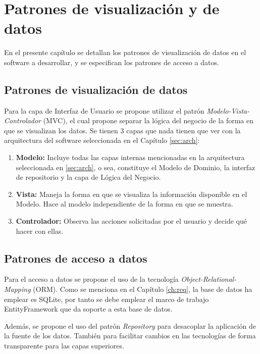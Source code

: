 \chapter{Patrones de visualización y de datos}

En el presente capítulo se detallan los patrones de visualización de datos en el software a desarrollar, y se especifican los patrones de acceso a datos.

\section{Patrones de visualización de datos}\label{sec:vis}

Para la capa de Interfaz de Usuario se propone utilizar el patrón \textit{Modelo-Vista-Controlador} (MVC), el cual propone separar la lógica del negocio de la forma en que se visualizan los datos. Se tienen 3 capas que nada tienen que ver con la arquitectura del software seleccionada en el Capítulo \ref{sec:arch}:

\begin{enumerate}
    \item \textbf{Modelo:} Incluye todas las capas internas mencionadas en la arquitectura seleccionada en \ref{sec:arch}, o sea, constituye el Modelo de Dominio, la interfaz de repositorio y la capa de Lógica del Negocio.
    \item \textbf{Vista:} Maneja la forma en que se visualiza la información disponible en el Modelo. Hace al modelo independiente de la forma en que se muestra.
    \item \textbf{Controlador:} Observa las acciones solicitadas por el usuario y decide qué hacer con ellas. 
\end{enumerate}

\section{Patrones de acceso a datos}\label{sec:data}

Para el acceso a datos se propone el uso de la tecnología \textit{Object-Relational-Mapping} (ORM). Como se menciona en el Capítulo \ref{ch:req}, la base de datos ha emplear es SQLite, por tanto se debe emplear el marco de trabajo EntityFramework que da soporte a esta base de datos.

Además, se propone el uso del patrón \textit{Repository} para desacoplar la aplicación de la fuente de los datos. También para facilitar cambios en las tecnologías de forma transparente para las capas superiores. 

